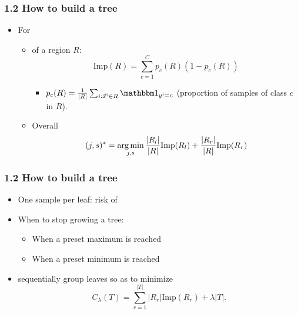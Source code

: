 \begin{frame}[t]
  \frametitle{1.2 How to build a tree}
  \begin{itemize}
  \item For  
    \begin{itemize}
      \setlength{\itemsep}{7pt}
    \item {} of a region $R$:
      \begin{equation*} 
        \text{Imp}(R) = \sum_{c=1}^{C}p_c(R)(1-p_c(R))
      \end{equation*}
      \begin{itemize}
      \item[] $p_c(R) = \frac1{\lvert R \rvert} \sum_{i : \xvec^i \in R} \indic_{y^i=c}$ (proportion of samples of class $c$ in $R$).     
      \end{itemize}
    \item Overall
      \begin{equation*}
        (j,s)^{\ast} = \operatorname*{arg\,min}_{j,s}\frac{\lvert R_l \rvert}{\lvert R \rvert}\text{Imp}(R_l) + \frac{\lvert R_r \rvert}{\lvert R \rvert}\text{Imp}(R_r)
      \end{equation*}
    \end{itemize}
  \end{itemize}
\end{frame}

\begin{frame}[t]
  \frametitle{1.2 How to build a tree}
  \begin{itemize}
  \item One sample per leaf: risk of 
  \item When to stop growing a tree:
    \begin{itemize}
      \setlength{\itemsep}{3pt}
    \item When a preset maximum  is reached
    \item When a preset minimum  is reached
    \end{itemize}
  \item {} sequentially group leaves so as to minimize  
      \begin{equation*}
        C_\lambda(T) = \sum_{r=1}^{|T|} \lvert R_r \rvert \text{Imp}(R_r) + \lambda \lvert T \rvert.
  \end{equation*}
  \end{itemize}
\end{frame}

